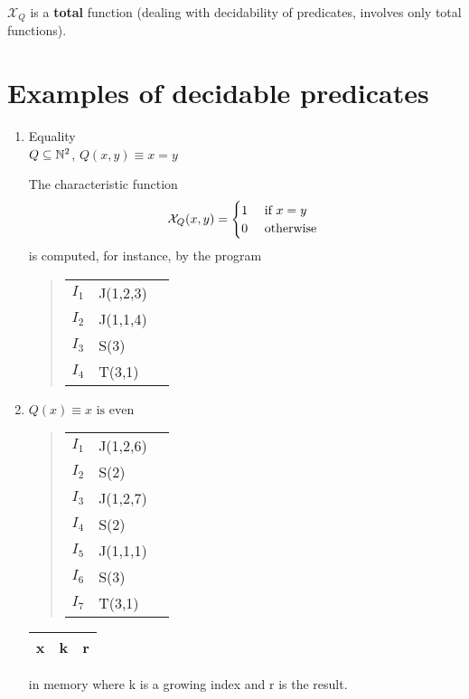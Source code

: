 \begin{remark}
    $\mathcal{X}_Q$ is a \textbf{total} function (dealing with decidability of predicates, involves only total functions).
\end{remark}


\section {Examples of decidable predicates}
\begin{enumerate}
    \item Equality\\
    $Q \subseteq \mathbb{N}^2$, $Q(x,y) \equiv x = y$

    The characteristic function
    \begin{equation*}
      \mathcal{X}_Q(x,y) =
      \begin{cases}
        1 & $ if $ x = y  \\
        0 & $ otherwise $
      \end{cases}
    \end{equation*}
    is computed, for instance, by the program
    \begin{quote}
    \begin{tabular}{lll}
    $I_1$ & J(1,2,3)  \\
    $I_2$ & J(1,1,4)       \\
    $I_3$ & S(3) \\
    $I_4$ & T(3,1)
    \end{tabular}
    \end{quote}

    \item $Q(x) \equiv x \text{ is even}$

    \begin{quote}
    \begin{tabular}{lll}
    $I_1$ & J(1,2,6)   \\
    $I_2$ & S(2)        \\
    $I_3$ & J(1,2,7)   \\
    $I_4$ & S(2)        \\
    $I_5$ & J(1,1,1) \\
    $I_6$ & S(3)        \\
    $I_7$ & T(3,1)
    \end{tabular}
    \end{quote}
    
    \begin{tabu}{|c|c|c|}
    \hline
    x & k & r \\
    \hline
    \end{tabu} in memory where k is a growing index and r is the result.
    

\end{enumerate}
